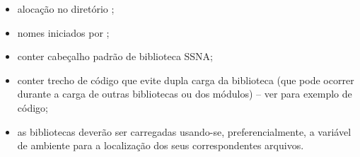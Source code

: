 \documentclass[a4paper,12pt]{article}
\begin{document}
    \begin{itemize}
        \item alocação no diretório ;
        \item nomes iniciados por ;
        \item conter cabeçalho padrão de biblioteca SSNA;
        \item conter trecho de código que evite dupla carga da biblioteca (que pode ocorrer durante a carga de outras bibliotecas ou dos módulos) -- ver  para exemplo de código;
        \item as bibliotecas deverão ser carregadas usando-se, preferencialmente, a variável de ambiente  para a localização dos seus correspondentes arquivos.
    \end{itemize}


\end{document}
